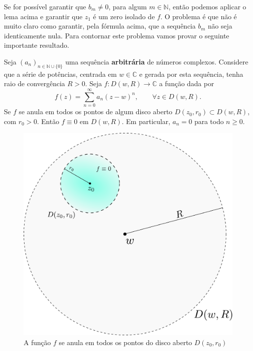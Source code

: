 Se for possível garantir que $b_m\neq 0$, para algum $m\in\mathbb{N}$,
então podemos aplicar o lema acima e garantir que $z_1$ é um 
zero isolado de $f$. O problema é que não é muito claro como 
garantir, pela fórmula acima, 
que a sequência $b_m$ não seja identicamente nula. 
Para contornar este problema vamos provar o seguinte importante resultado.

\begin{lema}\label{lema2-centro-serie-zero-isolado}
Seja $(a_n)_{n\in\mathbb{N}\cup\{0\}}$ uma sequência \textbf{arbitrária} 
de números complexos. Considere que a série de potências, 
centrada em $w\in\mathbb{C}$ e gerada por esta sequência, 
tenha raio de convergência $R>0$. 
Seja $f:D(w,R)\to\mathbb{C}$ a função dada por
\[
f(z) = \sum_{n=0}^{\infty}a_n(z-w)^n, \qquad \forall z\in D(w,R).
\]
Se $f$ se anula em todos os pontos de algum disco aberto 
$D(z_0,r_0)\subset D(w,R)$, com $r_0>0$.
Então $f\equiv 0$ em $D(w,R)$. Em particular, $a_n=0$ para todo $n\geqslant 0$.
\end{lema}

\begin{figure}[h]
\centering
\includegraphics[width=0.6\linewidth]{Figuras/zeros-isolados2}
\caption{A função $f$ se anula em todos os pontos do disco aberto $D(z_0,r_0)$}
\label{fig:zeros-isolados2}
\end{figure}




